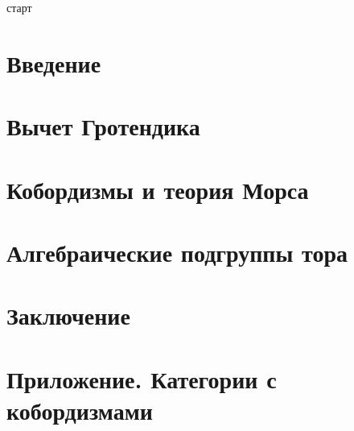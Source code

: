 \documentclass{article}
\begin{document}
старт

\tableofcontents

\section{Введение}

\section{Вычет Гротендика}

\section{Кобордизмы и теория Морса}

\section{Алгебраические подгруппы тора}

\section{Заключение}

\section{Приложение. Категории с кобордизмами}
\end{document}
